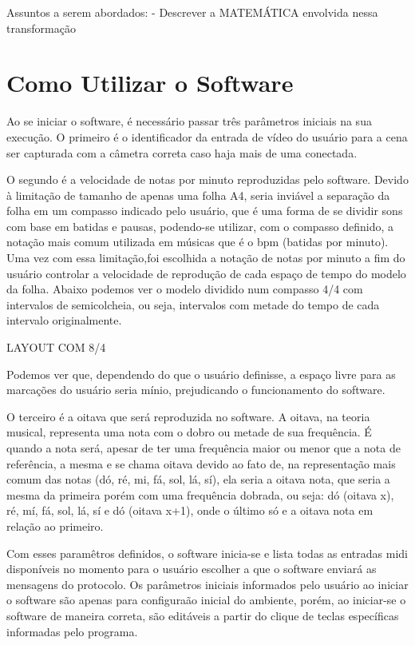 \documentclass[12pt]{report}
\begin{document}
Assuntos a serem abordados:
- Descrever a MATEMÁTICA envolvida nessa transformação 

\chapter{Como Utilizar o Software}
\label{cha:fund-teor}

Ao se iniciar o software, é necessário passar três parâmetros iniciais na sua execução. O primeiro é o identificador da entrada de vídeo do usuário para a cena ser capturada com a câmetra correta caso haja mais de uma conectada.

O segundo é a velocidade de notas por minuto reproduzidas pelo software. Devido à limitação de tamanho de apenas uma folha A4, seria inviável a separação da folha em um compasso indicado pelo usuário, que é uma forma de se dividir sons com base em batidas e pausas, podendo-se utilizar, com o compasso definido, a notação mais comum utilizada em músicas que é o bpm (batidas por minuto). Uma vez com essa limitação,foi escolhida a notação de notas por minuto a fim do usuário controlar a velocidade de reprodução de cada espaço de tempo do modelo da folha. Abaixo podemos ver o modelo dividido num compasso 4/4 com intervalos de semicolcheia, ou seja, intervalos com metade do tempo de cada intervalo originalmente.

LAYOUT COM 8/4

Podemos ver que, dependendo do que o usuário definisse, a espaço livre para as marcações do usuário seria mínio, prejudicando o funcionamento do software.

O terceiro é a oitava que será reproduzida no software. A oitava, na teoria musical, representa uma nota com o dobro ou metade de sua frequência. É quando a nota será, apesar de ter uma frequência maior ou menor que a nota de referência, a mesma e se chama oitava devido ao fato de, na representação mais comum das notas (dó, ré, mi, fá, sol, lá, sí), ela seria a oitava nota, que seria a mesma da primeira porém com uma frequência dobrada, ou seja: dó (oitava x), ré, mí, fá, sol, lá, sí e dó (oitava x+1), onde o último só e a oitava nota em relação ao primeiro.

Com esses paramêtros definidos, o software inicia-se e lista todas as entradas midi disponíveis no momento para o usuário escolher a que o software enviará as mensagens do protocolo. Os parâmetros iniciais informados pelo usuário ao iniciar o software são apenas para configuraão inicial do ambiente, porém, ao iniciar-se o software de maneira correta, são editáveis a partir do clique de teclas específicas informadas pelo programa.
\end{document}
